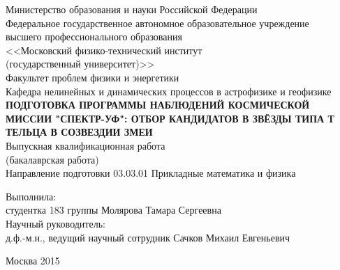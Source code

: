 \begin{titlepage}
\newpage
\begin{center}
Министерство образования и науки Российской Федерации\\
\vspace{1em} 
Федеральное государственное автономное образовательное учреждение\\
высшего профессионального образования\\
<<Московский физико-технический институт\\
(государственный университет)>>\\
\vspace{1em}
Факультет проблем физики и энергетики\\
\vspace{1em}
Кафедра нелинейных и динамических процессов в астрофизике и геофизике\\
\vspace{5em}
\textbf{\large\MakeTextUppercase{Подготовка программы наблюдений космической миссии "Спектр-УФ": отбор кандидатов в звёзды типа Т Тельца в созвездии Змеи}}\\
\vspace{1em}
Выпускная квалификационная работа\\
(бакалаврская работа)\\
\vspace{1em}
Направление подготовки 03.03.01 Прикладные математика и физика\\
\end{center}
\begin{flushleft}
\vspace{3em}
Выполнила:\\
студентка 183 группы \hrulefill Молярова Тамара Сергеевна\\
\vspace{3em}
Научный руководитель:\\
д.ф.-м.н., ведущий научный сотрудник \hrulefill Сачков Михаил Евгеньевич\\
\vspace{\fill}
\end{flushleft}
\begin{center}
Москва 2015
\end{center}
\end{titlepage}